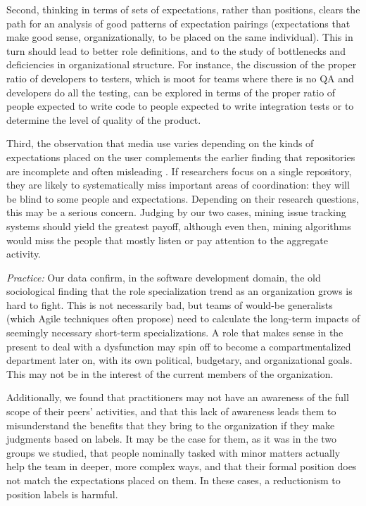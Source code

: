 \documentclass[10pt, conference, compsocconf]{IEEEtran}
\begin{document}
Second, thinking in terms of sets of expectations, rather than positions, clears the path for an analysis of good patterns of expectation pairings (expectations that make good sense, organizationally, to be placed on the same individual). This in turn should lead to better role definitions, and to the study of bottlenecks and deficiencies in organizational structure. For instance, the discussion of the proper ratio of developers to testers, which is moot for teams where there is no QA and developers do all the testing, can be explored in terms of the proper ratio of people expected to write code to people expected to write integration tests or to determine the level of quality of the product.

Third, the observation that media use varies depending on the kinds of expectations placed on the user complements the earlier finding that repositories are incomplete and often misleading \cite{Aranda2009}. If researchers focus on a single repository, they are likely to systematically miss important areas of coordination: they will be blind to some people and expectations. Depending on their research questions, this may be a serious concern. Judging by our two cases, mining issue tracking systems should yield the greatest payoff, although even then, mining algorithms would miss the people that mostly listen or pay attention to the aggregate activity.

\emph{Practice:} Our data confirm, in the software development domain, the old sociological finding that the role specialization trend as an organization grows is hard to fight. This is not necessarily bad, but teams of would-be generalists (which Agile techniques often propose) need to calculate the long-term impacts of seemingly necessary short-term specializations. A role that makes sense in the present to deal with a dysfunction may spin off to become a compartmentalized department later on, with its own political, budgetary, and organizational goals. This may not be in the interest of the current members of the organization.

Additionally, we found that practitioners may not have an awareness of the full scope of their peers' activities, and that this lack of awareness leads them to misunderstand the benefits that they bring to the organization if they make judgments based on labels. It may be the case for them, as it was in the two groups we studied, that people nominally tasked with minor matters actually help the team in deeper, more complex ways, and that their formal position does not match the expectations placed on them. In these cases, a reductionism to position labels is harmful.
\end{document}
